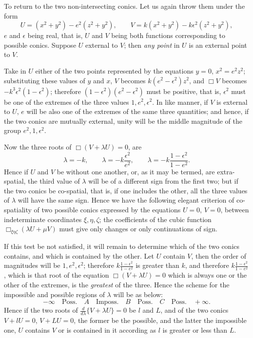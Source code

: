 \documentclass[11pt]{article}
\newcommand{\sourcepage}[1]{\marginpar{\scriptsize p.~#1}}
\begin{document}
{{\sourcepage{127}
To return to the two non-intersecting conics. Let us again throw them under the form
\[
U=(x^2+y^2)-e^2(z^2+y^2),\qquad
V=k(x^2+y^2)-k\epsilon^2(z^2+y^2),
\]
$e$ and $\epsilon$ being real, that is, $U$ and $V$ being both functions corresponding to possible conics. Suppose $U$ external to $V$; then \emph{any point} in $U$ is an external point to $V$.

Take in $U$ either of the two points represented by the equations $y=0$, $x^2=e^2z^2$; substituting these values of $y$ and $x$, $V$ becomes $k(e^2-\epsilon^2)z^2$, and $\Box V$ becomes $-k^3\epsilon^2(1-\epsilon^2)$; therefore $(1-\epsilon^2)(e^2-\epsilon^2)$ must be positive, that is, $\epsilon^2$ must be one of the extremes of the three values $1,e^2,\epsilon^2$. In like manner, if $V$ is external to $U$, $e$ will be also one of the extremes of the same three quantities; and hence, if the two conics are mutually external, unity will be the middle magnitude of the group $e^2,1,\epsilon^2$.

Now the three roots of $\Box(V+\lambda U)=0$, are
\[
\lambda=-k,\qquad
\lambda=-k\frac{\epsilon^2}{e^2},\qquad
\lambda=-k\frac{1-\epsilon^2}{1-e^2}.
\]
Hence if $U$ and $V$ be without one another, or, as it may be termed, are extra-spatial, the third value of $\lambda$ will be of a different sign from the first two; but if the two conics be co-spatial, that is, if one includes the other, all the three values of $\lambda$ will have the same sign. Hence we have the following elegant criterion of co-spatiality of two possible conics expressed by the equations $U=0$, $V=0$, between indeterminate coordinates $\xi,\eta,\zeta$; the coefficients of the cubic function $\Box_{\xi\eta\zeta}(\lambda U+\mu V)$ must give only changes or only continuations of sign.

If this test be not satisfied, it will remain to determine which of the two conics contains, and which is contained by the other. Let $U$ contain $V$, then the order of magnitudes will be $1,e^2,\epsilon^2$; therefore $k\frac{1-\epsilon^2}{1-e^2}$ is greater than $k$, and therefore $k\frac{1-\epsilon^2}{1-e^2}$, which is that root of the equation $\Box(V+\lambda U)=0$ which is always one or the other of the extremes, is the \emph{greatest} of the three. Hence the scheme for the impossible and possible regions of $\lambda$ will be as below:
\[
-\infty\quad\text{Poss.}\quad A\quad\text{Imposs.}\quad B\quad\text{Poss.}\quad C\quad\text{Poss.}\quad+\infty.
\]
Hence if the two roots of $\frac{d}{d\lambda}\{V+\lambda U\}=0$ be $l$ and $L$, and of the two conics $V+lU=0$, $V+LU=0$, the former be the possible, and the latter the impossible one, $U$ contains $V$ or is contained in it according as $l$ is greater or less than $L$.

}}
\end{document}
